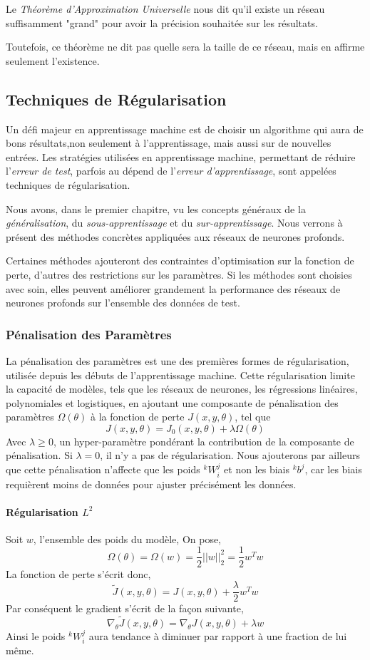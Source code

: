\documentclass[a4paper, 10pt]{report}
\newcommand{\lexp}[1]{\phantom{}^{#1}}
\newcommand{\elem}[4]{\lexp{#2}#1^{#3}_{#4}}
\begin{document}
Le \emph{Théorème d'Approximation Universelle} nous dit qu'il existe un réseau suffisamment "grand" pour avoir la précision souhaitée sur les résultats.

Toutefois, ce théorème ne dit pas quelle sera la taille de ce réseau, mais en affirme seulement l'existence.
\subsection{Techniques de Régularisation}
Un défi majeur en apprentissage machine est de choisir un algorithme qui aura de bons résultats,non seulement à l'apprentissage, mais aussi sur de nouvelles entrées.
Les stratégies utilisées en apprentissage machine, permettant de réduire l'\emph{erreur de test}, parfois au dépend de l'\emph{erreur d'apprentissage}, sont appelées techniques de régularisation.

Nous avons, dans le premier chapitre, vu les concepts généraux de la \emph{généralisation}, du \emph{sous-apprentissage} et du \emph{sur-apprentissage}.
Nous verrons à présent des méthodes concrètes appliquées aux réseaux de neurones profonds.

Certaines méthodes ajouteront des contraintes d'optimisation sur la fonction de perte, d'autres des restrictions sur les paramètres.
Si les méthodes sont choisies avec soin, elles peuvent améliorer grandement la performance des réseaux de neurones profonds sur l'ensemble des données de test.
\subsubsection{Pénalisation des Paramètres}
La pénalisation des paramètres est une des premières formes de régularisation, utilisée depuis les débuts de l'apprentissage machine.
Cette régularisation limite la capacité de modèles, tels que les réseaux de neurones, les régressions linéaires, polynomiales et logistiques, en ajoutant une composante de pénalisation des paramètres $\Omega(\theta)$ à la fonction de perte $J(x,y,\theta)$, tel que
$$J(x,y,\theta) = J_0(x,y,\theta) + \lambda \Omega(\theta)$$
Avec $\lambda \geq 0$, un hyper-paramètre pondérant la contribution de la composante de pénalisation.
Si $\lambda = 0$, il n'y a pas de régularisation.
Nous ajouterons par ailleurs que cette pénalisation n'affecte que les poids $\elem{W}{k}{j}{i}$ et non les biais $\elem{b}{k}{j}{}$, car les biais requièrent moins de données pour ajuster précisément les données.
\paragraph{Régularisation $L^2$}
Soit $w$, l'ensemble des poids du modèle,
On pose, $$\Omega(\theta) = \Omega(w) = \frac{1}{2} ||w||_2^2 = \frac{1}{2} w^T w$$
La fonction de perte s'écrit donc,
$$\tilde{J}(x,y,\theta) = J(x,y,\theta) + \frac{\lambda}{2} w^T w$$
Par conséquent le gradient s'écrit de la façon suivante,
$$\nabla_\theta \tilde{J}(x,y,\theta) = \nabla_\theta J(x,y,\theta) + \lambda w$$
Ainsi le poids $\elem{W}{k}{j}{i}$ aura tendance à diminuer par rapport à une fraction de lui même.
\end{document}
